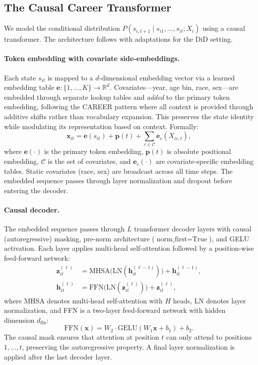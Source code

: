 \documentclass[12pt]{article}
\newcommand{\RR}{\mathbb{R}}
\begin{document}
\subsection{The Causal Career Transformer}\label{subsec:architecture}

We model the conditional distribution $P(s_{i,t+1} \mid s_{i1}, \ldots, s_{it}; X_i)$ using a causal transformer. The architecture follows \citet{vafa2022career} with adaptations for the DiD setting.

\paragraph{Token embedding with covariate side-embeddings.} Each state $s_{it}$ is mapped to a $d$-dimensional embedding vector via a learned embedding table $\mathbf{e}: \{1, \ldots, K\} \to \RR^d$. Covariates---year, age bin, race, sex---are embedded through separate lookup tables and \textit{added} to the primary token embedding, following the CAREER pattern where all context is provided through additive shifts rather than vocabulary expansion. This preserves the state identity while modulating its representation based on context. Formally:
\begin{equation}\label{eq:embedding}
\mathbf{x}_{it} = \mathbf{e}(s_{it}) + \mathbf{p}(t) + \sum_{c \in \mathcal{C}} \mathbf{e}_c(X_{ic,t}),
\end{equation}
where $\mathbf{e}(\cdot)$ is the primary token embedding, $\mathbf{p}(t)$ is absolute positional embedding, $\mathcal{C}$ is the set of covariates, and $\mathbf{e}_c(\cdot)$ are covariate-specific embedding tables. Static covariates (race, sex) are broadcast across all time steps. The embedded sequence passes through layer normalization and dropout before entering the decoder.

\paragraph{Causal decoder.} The embedded sequence passes through $L$ transformer decoder layers with causal (autoregressive) masking, pre-norm architecture ($\text{norm\_first} = \text{True}$), and GELU activation. Each layer applies multi-head self-attention followed by a position-wise feed-forward network:
\begin{align}
\mathbf{z}_{it}^{(\ell)} &= \text{MHSA}\bigl(\text{LN}(\mathbf{h}_{it}^{(\ell-1)})\bigr) + \mathbf{h}_{it}^{(\ell-1)}, \label{eq:mhsa}\\
\mathbf{h}_{it}^{(\ell)} &= \text{FFN}\bigl(\text{LN}(\mathbf{z}_{it}^{(\ell)})\bigr) + \mathbf{z}_{it}^{(\ell)}, \label{eq:ffn}
\end{align}
where MHSA denotes multi-head self-attention with $H$ heads, LN denotes layer normalization, and FFN is a two-layer feed-forward network with hidden dimension $d_{\text{ffn}}$:
\begin{equation}
\text{FFN}(\mathbf{x}) = W_2 \cdot \text{GELU}(W_1 \mathbf{x} + b_1) + b_2.
\end{equation}
The causal mask ensures that attention at position $t$ can only attend to positions $1, \ldots, t$, preserving the autoregressive property. A final layer normalization is applied after the last decoder layer.
\end{document}
